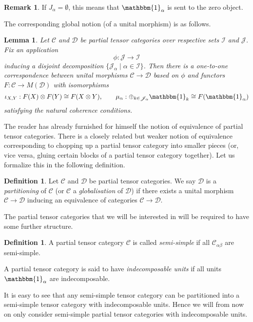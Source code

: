 \documentclass[10pt]{article}
\newcommand{\CatC}{\mathcal{C}}
\newcommand{\CatD}{\mathcal{D}}
\newcommand{\CatCC}{\mathscr{C}}
\newcommand{\CatDD}{\mathscr{D}}
\newcommand{\Unitb}{\mathbbm{1}}
\newtheorem{Lem}[Theorem]{Lemma}
\theoremstyle{definition}
\newtheorem{Def}[Theorem]{Definition}
\newtheorem{Rem}[Theorem]{Remark}
\numberwithin{equation}{section}
\begin{document}
\begin{Rem} If $J_{\alpha}=\emptyset$, this means that $\Unitb_{\alpha}$ is sent to the zero object.
\end{Rem} 

The corresponding global notion (of a unital morphism) is as follows.

\begin{Lem} Let $\CatCC$ and $\CatDD$ be partial tensor categories over respective sets $\mathscr{I}$ and $\mathscr{J}$. Fix an application \[\phi: \mathscr{J}\rightarrow \mathscr{I}\] inducing a disjoint decomposition $\{\mathscr{J}_\alpha\mid \alpha\in \mathscr{I}\}$. Then there is a one-to-one correspondence between unital morphisms $\CatCC\rightarrow \CatDD$ based on $\phi$ and functors $F:\CatC \rightarrow M(\CatD)$ with isomorphisms \[\iota_{X,Y}:F(X)\otimes F(Y)\cong F(X\otimes Y),\qquad \mu_\alpha:\oplus_{k\in \mathscr{J}_\alpha} \Unitb_k \cong F(\Unitb_\alpha)\] satisfying the natural coherence conditions. 
\end{Lem} 

The reader has already furnished for himself the notion of 
equivalence of partial tensor categories. There is a closely related
but weaker notion of equivalence corresponding to chopping up a partial tensor category into smaller pieces (or, vice versa, gluing certain blocks of a partial tensor category together). Let us formalize this in the following definition.

\begin{Def} Let $\CatCC$ and $\CatDD$ be partial tensor categories. We say $\CatDD$ is a \emph{partitioning} of $\CatCC$ (or $\CatCC$ a \emph{globalisation} of $\CatDD$) if there exists a unital morphism $\CatCC\rightarrow \CatDD$ inducing an equivalence of categories $\CatC\rightarrow \CatD$.
\end{Def}

The partial tensor categories that we will be interested in will be required to have some further structure. 

\begin{Def} A partial tensor category $\CatCC$ is called \emph{semi-simple} if all $\CatC_{\alpha\beta}$ are semi-simple. 

A partial tensor category is said to have \emph{indecomposable units} if all units $\Unitb_\alpha$ are indecomposable. 
\end{Def}

It is easy to see that any semi-simple tensor category can be partitioned into a semi-simple tensor category with indecomposable units.  Hence we will from now on only consider semi-simple partial tensor categories with indecomposable units.
 
\end{document}

